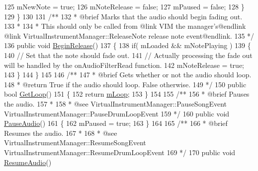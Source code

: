 \begin{DoxyCodeInclude}
125             mNewNote = \textcolor{keyword}{true};
126             mNoteRelease = \textcolor{keyword}{false};
127             mPaused = \textcolor{keyword}{false};
128         \}
129     \}
130 \textcolor{comment}{}
131 \textcolor{comment}{    /**}
132 \textcolor{comment}{     * @brief Marks that the audio should begin fading out. }
133 \textcolor{comment}{     * }
134 \textcolor{comment}{     * This should only be called from @link VIM the manager's@endlink @link
       VirtualInstrumentManager::ReleaseNote release note event@endlink.}
135 \textcolor{comment}{    */}
136     \textcolor{keyword}{public} \textcolor{keywordtype}{void} \hyperlink{group___n_o_o_pub_func_ga044e62759958d717c7fa4fd1615e2ec1}{BeginRelease}()
137     \{
138         \textcolor{keywordflow}{if}( mLoaded && mNotePlaying )
139         \{
140             \textcolor{comment}{// Set that the note should fade out. }
141             \textcolor{comment}{// Actually processing the fade out will be handled by the onAudioFilterRead function.}
142             mNoteRelease = \textcolor{keyword}{true};
143         \}
144     \}
145 \textcolor{comment}{}
146 \textcolor{comment}{    /**}
147 \textcolor{comment}{     * @brief Gets whether or not the audio should loop.}
148 \textcolor{comment}{     * @return True if the audio should loop. False otherwise.}
149 \textcolor{comment}{    */}
150     \textcolor{keyword}{public} \textcolor{keywordtype}{bool} \hyperlink{group___n_o_o_pub_func_ga24d76043802c442f571c5c34a854ff86}{GetLoop}()
151     \{
152         \textcolor{keywordflow}{return} \hyperlink{group___n_o_o_priv_var_gabf1d5013f44773e9fd3e4dbb59d74aeb}{mLoop};
153     \}
154 \textcolor{comment}{}
155 \textcolor{comment}{    /** }
156 \textcolor{comment}{     * @brief Pauses the audio.}
157 \textcolor{comment}{     * }
158 \textcolor{comment}{     * @see VirtualInstrumentManager::PauseSongEvent VirtualInstrumentManager::PauseDrumLoopEvent}
159 \textcolor{comment}{    */}
160     \textcolor{keyword}{public} \textcolor{keywordtype}{void} \hyperlink{group___n_o_o_pub_func_ga7977bc941f355866c7e4c141a8f7b8bb}{PauseAudio}()
161     \{
162         mPaused = \textcolor{keyword}{true};
163     \}
164 \textcolor{comment}{}
165 \textcolor{comment}{    /**}
166 \textcolor{comment}{     * @brief Resumes the audio.}
167 \textcolor{comment}{     * }
168 \textcolor{comment}{     * @see VirtualInstrumentManager::ResumeSongEvent VirtualInstrumentManager::ResumeDrumLoopEvent}
169 \textcolor{comment}{    */}
170     \textcolor{keyword}{public} \textcolor{keywordtype}{void} \hyperlink{group___n_o_o_pub_func_ga2df8edec357dd4123146c9a7e8485ffb}{ResumeAudio}()

\end{DoxyCodeInclude}
